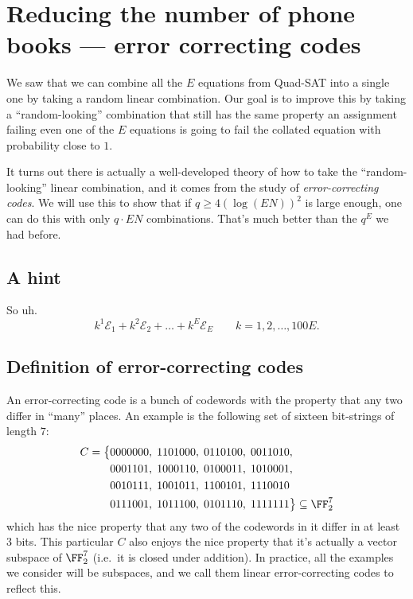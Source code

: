 \documentclass[11pt]{scrreprt}
\begin{document}
\section{Reducing the number of phone books --- error correcting codes}
We saw that we can combine all the $E$ equations from Quad-SAT into a single one
by taking a random linear combination.
Our goal is to improve this by taking a ``random-looking'' combination
that still has the same property an assignment failing even one of the $E$ equations
is going to fail the collated equation with probability close to $1$.

It turns out there is actually a well-developed theory of how to take
the ``random-looking'' linear combination,
and it comes from the study of \emph{error-correcting codes}.
We will use this to show that if $q \ge 4(\log (EN))^2$ is large enough,
one can do this with only $q \cdot EN$ combinations.
That's much better than the $q^E$ we had before.

\subsection{A hint}
So uh.
\[ k^1 \mathcal E_1 + k^2 \mathcal E_2 + \dots + k^E \mathcal E_E
  \qquad k = 1, 2, \dots, 100E. \]

\subsection{Definition of error-correcting codes}
An \alert{error-correcting code} is a bunch of codewords
with the property that any two differ in ``many'' places.
An example is the following set of sixteen bit-strings of length $7$:
\begin{align*}
  C = \big\{
    & 0000000, \; 1101000, \; 0110100, \; 0011010, \\
    & 0001101, \; 1000110, \; 0100011, \; 1010001, \\
    & 0010111, \; 1001011, \; 1100101, \; 1110010 \\
    & 0111001, \; 1011100, \; 0101110, \; 1111111 \big\} \subseteq \FF_2^7
\end{align*}
which has the nice property that any two of the codewords in it differ in at least $3$ bits.
This particular $C$ also enjoys the nice property that it's actually
a vector subspace of $\FF_2^7$ (i.e.\ it is closed under addition).
In practice, all the examples we consider will be subspaces,
and we call them \alert{linear error-correcting codes} to reflect this.
\end{document}
